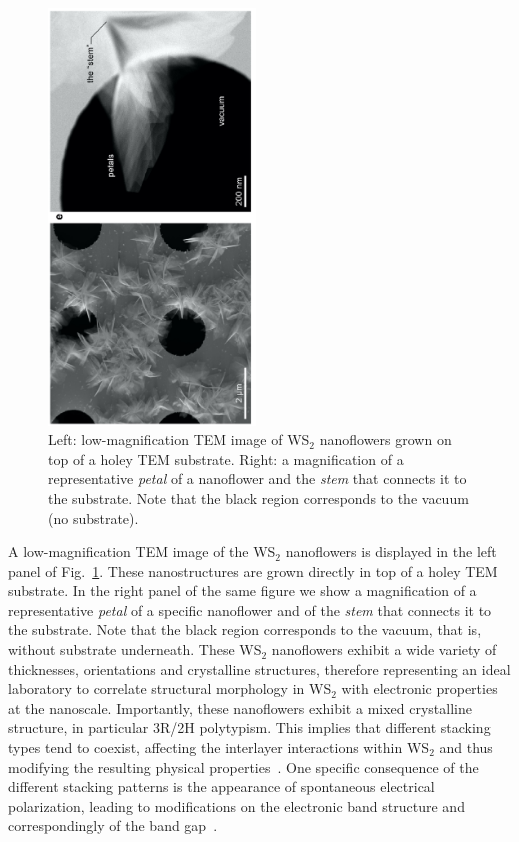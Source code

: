 \begin{figure}[t]
    \centering
    \includegraphics[width=0.49\textwidth,angle=-90]{plots/nanoflowers.pdf}
    \caption{Left: low-magnification TEM image of WS$_2$ nanoflowers
      grown on top of a holey TEM substrate. Right: a magnification of a
      representative {\it petal}
      of a nanoflower and the {\it stem} that connects it to the substrate.
      Note that the black region corresponds to the vacuum (no substrate).
       }
    \label{fig:nanoflowers}
\end{figure}

A low-magnification TEM image of the WS$_2$ nanoflowers is displayed
in the left panel of Fig.~\ref{fig:nanoflowers}.
%
These nanostructures are grown directly in top of a holey TEM substrate.
%
In the right panel of the same figure we show a magnification of a
      representative {\it petal}
      of a specific nanoflower and of the {\it stem} that connects it to the substrate.
      Note that the black region corresponds to the vacuum, that is, without
      substrate underneath.
%
These WS$_2$ nanoflowers exhibit a wide variety of thicknesses, orientations
and crystalline structures, therefore representing an ideal laboratory to correlate
structural morphology in WS$_2$ with electronic properties at the nanoscale.
%
Importantly, these nanoflowers exhibit a mixed crystalline structure,
in particular 3R/2H polytypism.
%
This implies that different stacking types tend to coexist,  affecting
the interlayer interactions within WS$_2$
and thus modifying the resulting physical properties~\cite{Na:2018}.
%
One specific consequence of the different stacking patterns is the appearance of
spontaneous electrical polarization, leading to modifications on the 
electronic band structure and correspondingly of the band gap~\cite{Lee:2016}.



